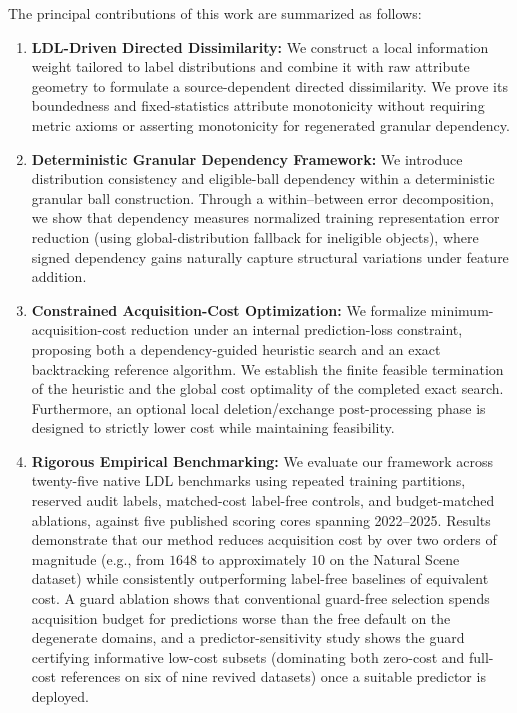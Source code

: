 The principal contributions of this work are summarized as follows:
\begin{enumerate}
	\item \textbf{LDL-Driven Directed Dissimilarity:} We construct a local information weight tailored to label distributions and combine it with raw attribute geometry to formulate a source-dependent directed dissimilarity. We prove its boundedness and fixed-statistics attribute monotonicity without requiring metric axioms or asserting monotonicity for regenerated granular dependency.
	\item \textbf{Deterministic Granular Dependency Framework:} We introduce distribution consistency and eligible-ball dependency within a deterministic granular ball construction. Through a within--between error decomposition, we show that dependency measures normalized training representation error reduction (using global-distribution fallback for ineligible objects), where signed dependency gains naturally capture structural variations under feature addition.
	\item \textbf{Constrained Acquisition-Cost Optimization:} We formalize minimum-acquisition-cost reduction under an internal prediction-loss constraint, proposing both a dependency-guided heuristic search and an exact backtracking reference algorithm. We establish the finite feasible termination of the heuristic and the global cost optimality of the completed exact search. Furthermore, an optional local deletion/exchange post-processing phase is designed to strictly lower cost while maintaining feasibility.
	\item \textbf{Rigorous Empirical Benchmarking:} We evaluate our framework across twenty-five native LDL benchmarks using repeated training partitions, reserved audit labels, matched-cost label-free controls, and budget-matched ablations, against five published scoring cores spanning 2022--2025. Results demonstrate that our method reduces acquisition cost by over two orders of magnitude (e.g., from $1648$ to approximately $10$ on the Natural Scene dataset) while consistently outperforming label-free baselines of equivalent cost. A guard ablation shows that conventional guard-free selection spends acquisition budget for predictions worse than the free default on the degenerate domains, and a predictor-sensitivity study shows the guard certifying informative low-cost subsets (dominating both zero-cost and full-cost references on six of nine revived datasets) once a suitable predictor is deployed.
\end{enumerate}

